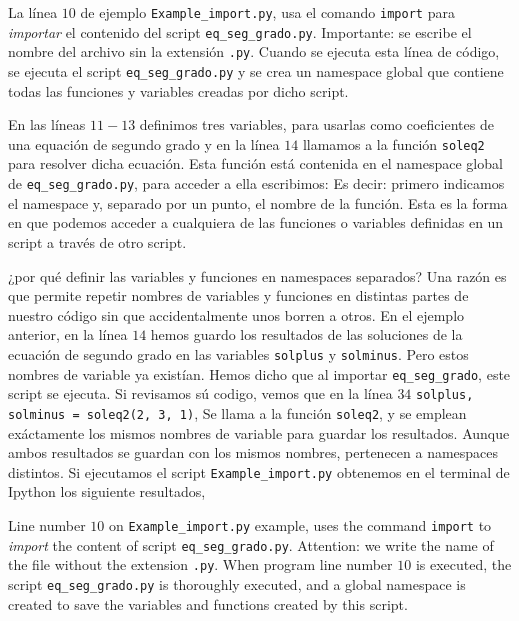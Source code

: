 \begin{paracol}{2}
La línea $10$ de ejemplo \texttt{Example_import.py}, usa el comando \texttt{import} para \emph{importar} el contenido del script \texttt{eq_seg_grado.py}. Importante: se escribe el nombre del archivo sin la extensión \texttt{.py}. Cuando se ejecuta esta línea de código, se ejecuta el script \texttt{eq_seg_grado.py} y se crea un namespace global que contiene todas las funciones y variables creadas por dicho script. 

En las líneas $11-13$ definimos tres variables, para usarlas como coeficientes de una equación de segundo grado y en la línea $14$ llamamos a la función \texttt{soleq2} para resolver dicha ecuación. Esta función está contenida en el namespace global de \texttt{eq_seg_grado.py}, para acceder a ella escribimos:
Es decir: primero indicamos el namespace y, separado por un punto, el nombre de la función. Esta es la forma en que podemos acceder a cualquiera de las funciones o variables definidas en un script a través de otro script.

¿por qué definir las variables y funciones en namespaces separados? Una razón es que permite repetir nombres de variables y funciones en distintas partes de nuestro código sin que accidentalmente unos borren a otros. En el ejemplo anterior, en la línea $14$ hemos guardo los resultados de las soluciones de la ecuación de segundo grado en las variables \texttt{solplus} y \texttt{solminus}. Pero estos nombres de variable ya existían. Hemos dicho que al importar \texttt{eq_seg_grado}, este script se ejecuta. Si revisamos sú codigo, vemos que en la línea $34$ \texttt{solplus, solminus = soleq2(2, 3, 1)}, Se llama a la función \texttt{soleq2}, y se emplean exáctamente los mismos nombres de variable para guardar los resultados. Aunque ambos resultados se guardan con los mismos nombres, pertenecen a namespaces distintos. Si ejecutamos el script \texttt{Example_import.py} obtenemos en el terminal de Ipython los siguiente resultados,

\switchcolumn
Line number $10$ on \texttt{Example_import.py} example, uses the command \texttt{import} to \emph{import} the content of script \texttt{eq_seg_grado.py}. Attention: we write the name of the file without the extension \texttt{.py}. When program line number $10$ is executed, the script \texttt{eq_seg_grado.py} is thoroughly executed, and a global namespace is created to save the variables and functions created by this script.


\end{paracol}
